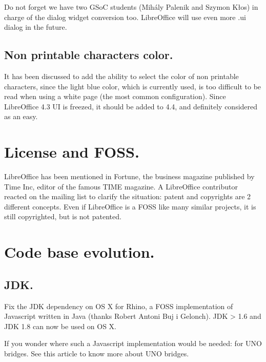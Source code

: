 \documentclass{article}
\begin{document}
Do not forget we have two GSoC students (Mihály Palenik and Szymon Kłos) in charge of the dialog widget conversion too\cite{gsocDialogConversion}. LibreOffice will use even more .ui dialog in the future.

\subsection{Non printable characters color.}

It has been discussed to add the ability to select the color of non printable characters, since the light blue color, which is currently used, is too difficult to be read when using a white page (the most common configuration)\cite{lightBlueCharacter}. Since LibreOffice 4.3 UI is freezed, it should be added to 4.4, and definitely considered as an easy\cite{lightBlueCharacterEasyHackProposal}.



\section{License and FOSS.}

LibreOffice has been mentioned in Fortune\cite{fortuneTime}, the business magazine published by Time Inc, editor of the famous TIME magazine. A LibreOffice contributor reacted on the mailing list\cite{fortuneTimeReaction} to clarify the situation: patent and copyrights are 2 different concepts. Even if LibreOffice is a FOSS like many similar projects, it is still copyrighted, but is not patented. 



\section{Code base evolution.}

\subsection{JDK.}

Fix the JDK dependency on OS X for Rhino\cite{javaDepRhino1}\cite{javaDepRhino2}, a FOSS implementation of Javascript written in Java\cite{rhinoDefinition} (thanks Robert Antoni Buj i Gelonch). JDK > 1.6 and JDK 1.8 can now be used on OS X.

If you wonder where such a Javascript implementation would be needed: for UNO bridges. See this article to know more about UNO bridges\cite{unoBridges}.
\end{document}
